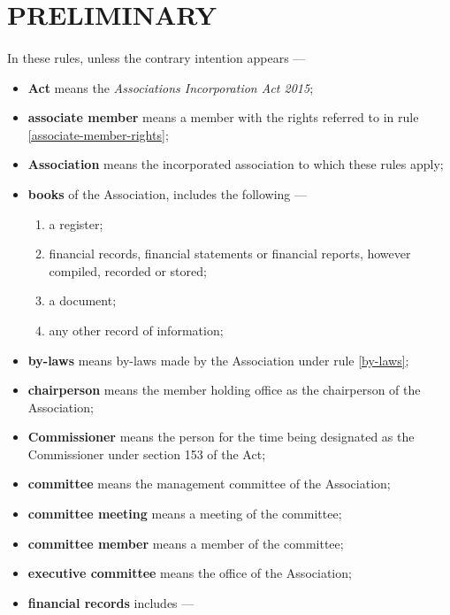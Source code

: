 \documentclass[../constitution.tex]{subfiles}
\begin{document}
\part{PRELIMINARY} \label{part-1---preliminary}

\subsection{} \label{terms-used}

In these rules, unless the contrary intention appears ---

\begin{itemize}[label={-}]
\item \textbf{Act} means the \textit{Associations Incorporation Act 2015};
\item \textbf{associate member} means a member with the rights referred to in rule \ref{associate-member-rights};
\item \textbf{Association} means the incorporated association to which these rules apply;
\item \textbf{books} of the Association, includes the following ---

  \begin{enumerate}
  \def\labelenumi{\alph{enumi})}
  \setcounter{enumi}{0}
  
  \item a register;
  \item financial records, financial statements or financial reports, however compiled, recorded or stored;
  \item a document;
  \item any other record of information;
  \end{enumerate}
\item \textbf{by-laws} means by-laws made by the Association under rule \ref{by-laws};
\item \textbf{chairperson} means the  member holding office as the chairperson of the Association;
\item \textbf{Commissioner} means the person for the time being designated as the Commissioner under section 153 of the Act;
\item \textbf{committee} means the management committee of the Association;
\item \textbf{committee meeting} means a meeting of the committee;
\item \textbf{committee member} means a member of the committee;
\item \textbf{executive committee} means the office  of the Association; 
\item \textbf{financial records} includes ---


\end{itemize}
\end{document}
